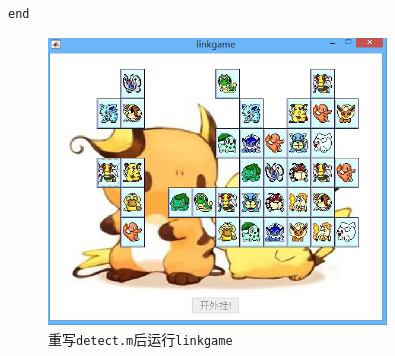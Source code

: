 \documentclass{article}
\numberwithin{figure}{section}
\numberwithin{table}{section}
\numberwithin{listing}{section}
\numberwithin{equation}{section}
\begin{document}
\begin{enumerate}
\begin{verbatim}
end
                \end{verbatim}
                \begingroup
                \endgroup

                \begin{figure}[H]
                    \centering
                    \includegraphics[width=0.8\textwidth]{mydetect_linkgame}
                    \caption{重写\texttt{detect.m}后运行\texttt{linkgame}}
                \end{figure}

        \end{enumerate}

\end{document}
